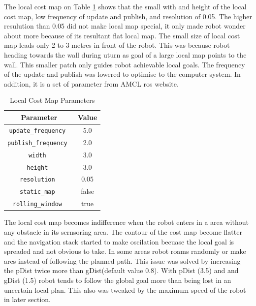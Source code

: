 \documentclass[10pt,journal,compsoc]{IEEEtran}
\begin{document}
The local cost map on Table \ref{table:local_costmap_parameters} shows that the small with and height of the local cost map, low frequency of update and publish, and resolution of 0.05. The higher resulution than 0.05 did not make local map special, it only made robot wonder about more because of its resultant flat local map.
The small size of local cost map leads only 2 to 3 metres in front of the robot. This was because robot heading towards the wall during uturn as goal of a large local map points to the wall. This smaller patch only guides robot achievable local goals.
The frequency of the update and publish was lowered to optimise to the computer system. In addition, it is a set of parameter from AMCL ros website. 
\begin{table}[ht]
      \caption{Local Cost Map Parameters}
      \label{table:local_costmap_parameters}
      \begin{center}
      \begin{tabular}{|c|c|}
      \hline
      Parameter & Value \\
      \hline\hline
      \verb!update_frequency !& 5.0\\
      \hline
      \verb!publish_frequency !& 2.0\\
      \hline
      \verb!width !& 3.0\\
      \hline
      \verb!height !& 3.0\\
      \hline
      \verb!resolution !& 0.05\\
      \hline
      \verb!static_map !& false\\
      \hline
      \verb!rolling_window !& true\\
      \hline
      \end{tabular}
      \end{center}
\end{table}
The local cost map becomes indifference when the robot enters in a area without any obstacle in its sernsoring area. The contour of the cost map become flatter and the navigation stack started to make oscilation becuase the local goal is spreaded and not obvious to take. In some areas robot roams randomly or make arcs instead of following the planned path. This issue was solved by increasing the pDist twice more than gDist(default value 0.8). With pDist (3.5) and and gDist (1.5) robot tends to follow the global goal more than being lost in an uncertain local plan. This also was tweaked by the maximum speed of the robot in later section.
\end{document}
